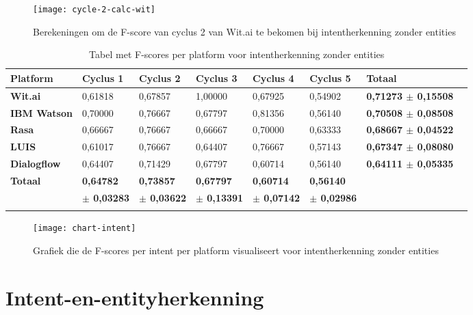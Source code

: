 \begin{figure}[H]
    \label{fig:cycle-2-calc-wit}
    \centering
    \texttt{[image: cycle-2-calc-wit]}
    \caption{Berekeningen om de F-score van cyclus 2 van Wit.ai te bekomen bij intentherkenning zonder entities}
\end{figure}

\begin{center}
    \begin{longtable}{| l | l | l | l | l |  l | l | l |}
        \hline
        \textbf{Platform} & \textbf{Cyclus 1} & \textbf{Cyclus 2} & \textbf{Cyclus 3} & \textbf{Cyclus 4} & \textbf{Cyclus 5} & \textbf{Totaal} \\ \hline
         \textbf{Wit.ai} & 0,61818 & 0,67857 & 1,00000 & 0,67925 & 0,54902 & \textbf{0,71273 $\pm$ 0,15508} \\ \hline  
        \textbf{IBM Watson} & 0,70000 & 0,76667 & 0,67797 & 0,81356 & 0,56140 & \textbf{0,70508 $\pm$ 0,08508} \\ \hline 
         \textbf{Rasa} & 0,66667 & 0,76667 & 0,66667 & 0,70000 & 0,63333 & \textbf{0,68667 $\pm$ 0,04522} \\ \hline 
        \textbf{LUIS} & 0,61017 & 0,76667 & 0,64407 & 0,76667 & 0,57143 & \textbf{0,67347 $\pm$ 0,08080} \\ \hline           
        \textbf{Dialogflow} & 0,64407 & 0,71429 & 0,67797 & 0,60714 & 0,56140 & \textbf{0,64111 $\pm$ 0,05335} \\ \hline  
        \textbf{Totaal} & \textbf{0,64782} & \textbf{0,73857} & \textbf{0,67797} & \textbf{0,60714} & \textbf{0,56140} &    \\
        & \textbf{$\pm$ 0,03283} & \textbf{$\pm$ 0,03622} & \textbf{$\pm$ 0,13391} & \textbf{$\pm$ 0,07142} & \textbf{$\pm$ 0,02986} &    \\ \hline
        \caption{Tabel met F-scores per platform voor intentherkenning zonder entities}                                    
    \end{longtable}
    \label{tbl:results-intent-no-entity}
\end{center}

\begin{figure}[H]
    \label{fig:chart-intent-no-entity}
    \centering
    \texttt{[image: chart-intent]}
    \caption{Grafiek die de F-scores per intent per platform visualiseert voor intentherkenning zonder entities}
\end{figure}

\section{Intent-en-entityherkenning}

